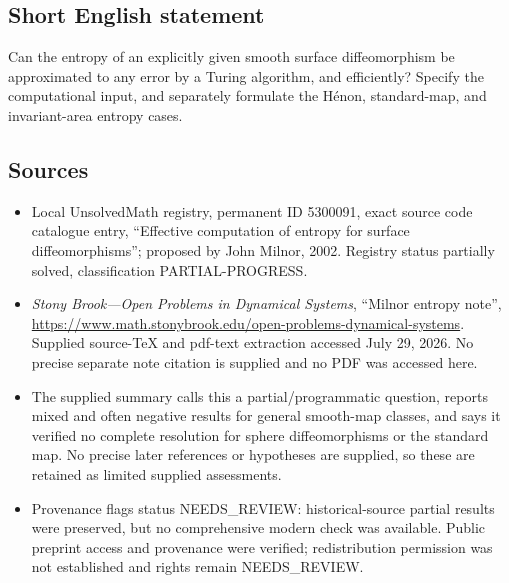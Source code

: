 \documentclass[11pt]{article}
\begin{document}
\subsection{Short English statement}
Can the entropy of an explicitly given smooth surface diffeomorphism be approximated to any error by a Turing algorithm, and efficiently? Specify the computational input, and separately formulate the H\'enon, standard-map, and invariant-area entropy cases.
\subsection{Sources}
\begin{itemize}
\item Local UnsolvedMath registry, permanent ID 5300091, exact source code catalogue entry, ``Effective computation of entropy for surface diffeomorphisms''; proposed by John Milnor, 2002. Registry status partially solved, classification PARTIAL-PROGRESS.
\item \emph{Stony Brook---Open Problems in Dynamical Systems}, ``Milnor entropy note'', \url{https://www.math.stonybrook.edu/open-problems-dynamical-systems}. Supplied source-TeX and pdf-text extraction accessed July 29, 2026. No precise separate note citation is supplied and no PDF was accessed here.
\item The supplied summary calls this a partial/programmatic question, reports mixed and often negative results for general smooth-map classes, and says it verified no complete resolution for sphere diffeomorphisms or the standard map. No precise later references or hypotheses are supplied, so these are retained as limited supplied assessments.
\item Provenance flags status NEEDS\_REVIEW: historical-source partial results were preserved, but no comprehensive modern check was available. Public preprint access and provenance were verified; redistribution permission was not established and rights remain NEEDS\_REVIEW.
\end{itemize}
\end{document}
